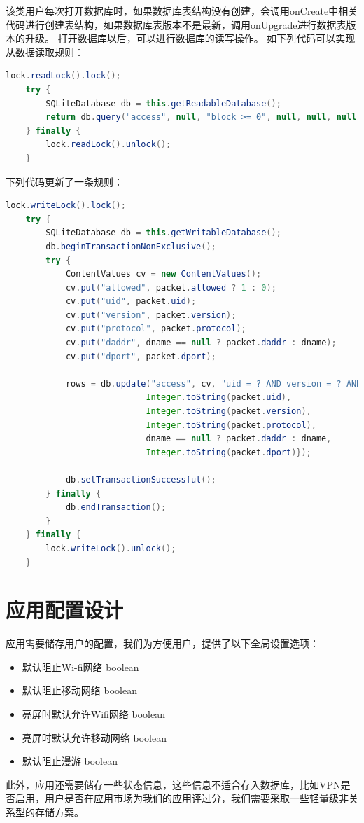 \documentclass[format=final, language=chinese, degree=fyp]{hustthesis}
\begin{document}
   该类用户每次打开数据库时，如果数据库表结构没有创建，会调用onCreate中相关代码进行创建表结构，如果数据库表版本不是最新，调用onUpgrade进行数据表版本的升级。
   打开数据库以后，可以进行数据库的读写操作。
   如下列代码可以实现从数据读取规则：

\begin{lstlisting}[language=java]
    lock.readLock().lock();
    try {
        SQLiteDatabase db = this.getReadableDatabase();
        return db.query("access", null, "block >= 0", null, null, null, "uid");
    } finally {
        lock.readLock().unlock();
    }
\end{lstlisting}

   下列代码更新了一条规则：

\begin{lstlisting}[language=java]
    lock.writeLock().lock();
    try {
        SQLiteDatabase db = this.getWritableDatabase();
        db.beginTransactionNonExclusive();
        try {
            ContentValues cv = new ContentValues();
            cv.put("allowed", packet.allowed ? 1 : 0);
            cv.put("uid", packet.uid);
            cv.put("version", packet.version);
            cv.put("protocol", packet.protocol);
            cv.put("daddr", dname == null ? packet.daddr : dname);
            cv.put("dport", packet.dport);

            rows = db.update("access", cv, "uid = ? AND version = ? AND protocol = ? AND daddr = ? AND dport = ?", new String[]{
                            Integer.toString(packet.uid),
                            Integer.toString(packet.version),
                            Integer.toString(packet.protocol),
                            dname == null ? packet.daddr : dname,
                            Integer.toString(packet.dport)});

            db.setTransactionSuccessful();
        } finally {
            db.endTransaction();
        }
    } finally {
        lock.writeLock().unlock();
    }
\end{lstlisting}


\section{应用配置设计}

应用需要储存用户的配置，我们为方便用户，提供了以下全局设置选项：
\begin{itemize}
	\item 默认阻止Wi-fi网络        boolean
	\item 默认阻止移动网络          boolean
	\item 亮屏时默认允许Wifi网络     boolean
	\item 亮屏时默认允许移动网络      boolean
	\item 默认阻止漫游              boolean
\end{itemize}
此外，应用还需要储存一些状态信息，这些信息不适合存入数据库，比如VPN是否启用，用户是否在应用市场为我们的应用评过分，我们需要采取一些轻量级非关系型的存储方案。
\end{document}
